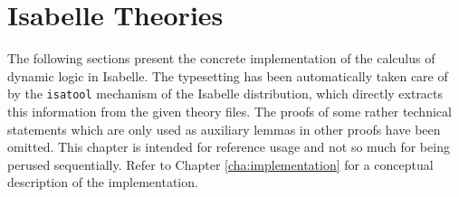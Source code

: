 \chapter{Isabelle Theories}
\label{cha:isabelle-theories}

The following sections present the concrete implementation of the calculus of
dynamic logic in Isabelle. The typesetting has been automatically taken care of
by the \verb|isatool| mechanism of the Isabelle distribution, which directly
extracts this information from the given theory files. The proofs of some rather
technical statements which are only used as auxiliary lemmas in other proofs
have been omitted. This chapter is intended for reference usage and not so much
for being perused sequentially.  Refer to Chapter \ref{cha:implementation} for a
conceptual description of the implementation.






